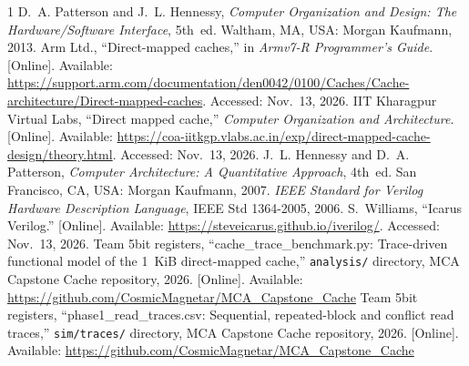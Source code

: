 \documentclass[conference,a4paper]{IEEEtran}
\begin{document}
\begin{thebibliography}{1}\label{sec:refs}
 D.~A. Patterson and J.~L. Hennessy, \emph{Computer Organization and Design: The Hardware/Software Interface}, 5th~ed. Waltham, MA, USA: Morgan Kaufmann, 2013.
 Arm Ltd., ``Direct-mapped caches,'' in \emph{Armv7-R Programmer's Guide}. [Online]. Available: \url{https://support.arm.com/documentation/den0042/0100/Caches/Cache-architecture/Direct-mapped-caches}. Accessed: Nov.~13, 2026.
 IIT Kharagpur Virtual Labs, ``Direct mapped cache,'' \emph{Computer Organization and Architecture}. [Online]. Available: \url{https://coa-iitkgp.vlabs.ac.in/exp/direct-mapped-cache-design/theory.html}. Accessed: Nov.~13, 2026.
 J.~L. Hennessy and D.~A. Patterson, \emph{Computer Architecture: A Quantitative Approach}, 4th~ed. San Francisco, CA, USA: Morgan Kaufmann, 2007.
 \emph{IEEE Standard for Verilog Hardware Description Language}, IEEE Std 1364-2005, 2006.
 S.~Williams, ``Icarus Verilog.'' [Online]. Available: \url{https://steveicarus.github.io/iverilog/}. Accessed: Nov.~13, 2026.
 Team 5bit registers, ``cache\_trace\_benchmark.py: Trace-driven functional model of the 1~KiB direct-mapped cache,'' \texttt{analysis/} directory, MCA Capstone Cache repository, 2026. [Online]. Available: \url{https://github.com/CosmicMagnetar/MCA_Capstone_Cache}
 Team 5bit registers, ``phase1\_read\_traces.csv: Sequential, repeated-block and conflict read traces,'' \texttt{sim/traces/} directory, MCA Capstone Cache repository, 2026. [Online]. Available: \url{https://github.com/CosmicMagnetar/MCA_Capstone_Cache}
\end{thebibliography}
\end{document}
